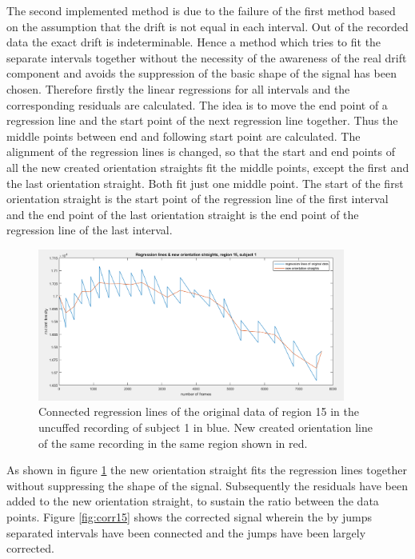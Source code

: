 The second implemented method is due to the failure of the first method based on the assumption that the drift is not equal in each interval. Out of the recorded data the exact drift is indeterminable. Hence a method which tries to fit the separate intervals together without the necessity of the awareness of the real drift component and avoids the suppression of the basic shape of the signal has been chosen.
Therefore firstly the linear regressions for all intervals and the corresponding residuals are calculated.
The idea is to move the end point of a regression line and the start point of the next regression line together. Thus the middle points between end and following start point are calculated. The alignment of the regression lines is changed, so that the start and end points of all the new created orientation straights fit the middle points, except the first and the last orientation straight. Both fit just one middle point. The start of the first orientation straight is the start point of the regression line of the first interval and the end point of the last orientation straight is the end point of the regression line of the last interval.
\begin{figure}[H]
	\includegraphics[width=0.9\textwidth]{figures/reg15}
	\caption{Connected regression lines of the original data of region 15 in the uncuffed recording of subject 1 in blue. New created orientation line of the same recording in the same region shown in red.}
	\label{fig:reg15}
\end{figure}
As shown in figure \ref{fig:reg15} the new orientation straight fits the regression lines together without suppressing the shape of the signal. Subsequently the residuals have been added to the new orientation straight, to sustain the ratio between the data points. Figure \ref{fig:corr15} shows the corrected signal wherein the by jumps separated intervals have been connected and the jumps have been largely corrected.
